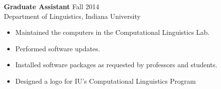 \begin{singlespace}
\vspace{6pt}
\noindent\textbf{Graduate Assistant} \hfill Fall 2014 \\
Department of Linguistics, Indiana University
\begin{itemize} \itemsep2pt
\item Maintained the computers in the Computational Linguistics Lab. 
\item Performed software updates. 
\item Installed software packages as requested by professors and students.
\item Designed a logo for IU's Computational Linguistics Program %
\end{itemize}


\end{singlespace}
